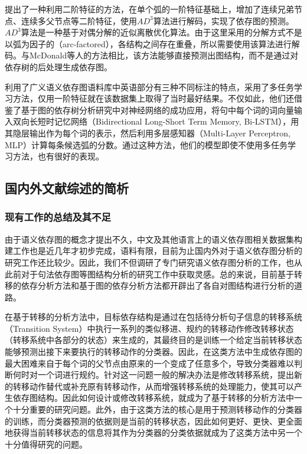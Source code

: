提出了一种利用二阶特征的方法，在单个弧的一阶特征基础上，增加了连续兄弟节点、连续多父节点等二阶特征，使用$AD^3$算法进行解码，实现了依存图的预测。$AD^3$算法是一种基于对偶分解的近似离散优化算法。由于这里采用的分解方式不是以弧为因子的（arc-factored），各结构之间存在重叠，所以需要使用该算法进行解码。与McDonald等人的方法相比，该方法能够直接预测出图结构，而不是通过对依存树的后处理生成依存图。

利用了广义语义依存图语料库中英语部分有三种不同标注的特点，采用了多任务学习方法，仅用一阶特征就在该数据集上取得了当时最好结果。不仅如此，他们还借鉴了基于图的依存树分析研究中对神经网络的成功应用，将句中每个词的词向量输入双向长短时记忆网络（Bidirectional Long-Short Term Memory, Bi-LSTM），用其隐层输出作为每个词的表示，然后利用多层感知器（Multi-Layer Perceptron, MLP）计算每条候选弧的分数。通过这种方法，他们的模型即使不使用多任务学习方法，也有很好的表现。


\subsection{国内外文献综述的简析}
\subsubsection{现有工作的总结及其不足}
\label{drawback}

由于语义依存图的概念才提出不久，中文及其他语言上的语义依存图相关数据集构建工作也是近几年才初步完成，语料有限，目前为止国内外对于语义依存图分析的研究工作还比较少。因此，我们不但调研了专门研究语义依存图分析的工作，也从此前对于句法依存图等图结构分析的研究工作中获取灵感。总的来说，目前基于转移的依存分析方法和基于图的依存分析方法都开辟出了各自对图结构进行分析的道路。

在基于转移的分析方法中，目标依存结构是通过在包括待分析句子信息的转移系统（Transition System）中执行一系列的类似移进、规约的转移动作修改转移状态（转移系统中各部分的状态）来生成的，其最终目的是训练一个给定当前转移状态能够预测出接下来要执行的转移动作的分类器。因此，在这类方法中生成依存图的最大困难来自于每个词的父节点由原来的一个变成了任意多个，导致分类器难以判断何时对一个词进行规约。针对这一问题一般的解决办法是修改转移系统，提出新的转移动作替代或补充原有转移动作，从而增强转移系统的处理能力，使其可以产生依存图结构。因此如何设计或修改转移系统，就成为了基于转移的分析方法中一个十分重要的研究问题。此外，由于这类方法的核心是用于预测转移动作的分类器的训练，而分类器预测的依据则是当前的转移状态，因此如何更好、更快、更全面地获得当前转移状态的信息将其作为分类器的分类依据就成为了这类方法中另一个十分值得研究的问题。

